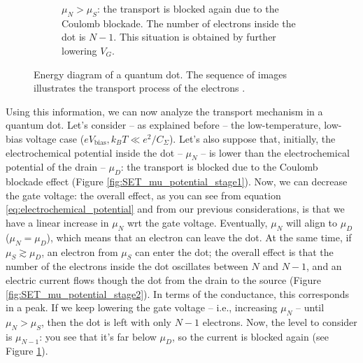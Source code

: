 \begin{figure}
\begin{subfigure}[t]{0.45\textwidth}
		\caption{$\mu_N>\mu_S$: the transport is blocked again due to the Coulomb blockade. The number of electrons inside the dot is $N-1$. This situation is obtained by further lowering $V_G$.}
		\label{fig:SET_mu_potential_stage3}
		\end{subfigure}
	\caption{Energy diagram of a quantum dot. The sequence of images illustrates the transport process of the electrons \citep[adapted from][]{Fasth2007}.}
	\label{fig:SET_mu_potential}
\end{figure}

Using this information, we can now analyze the transport mechanism in a quantum dot. Let's consider -- as explained before -- the low-temperature, low-bias voltage case ($eV_{\text{bias}},k_BT \ll e^2/C_{\Sigma}$). Let's also suppose that, initially, the electrochemical potential inside the dot -- $\mu_N$ -- is lower than the electrochemical potential of the drain -- $\mu_D$: the transport is blocked due to the Coulomb blockade effect (Figure \ref{fig:SET_mu_potential_stage1}). Now, we can decrease the gate voltage: the overall effect, as you can see from equation \eqref{eq:electrochemical_potential} and from our previous considerations, is that we have a linear increase in $\mu_N$ wrt the gate voltage. Eventually, $\mu_N$ will align to $\mu_D$ ($\mu_N = \mu_D$), which means that an electron can leave the dot. At the same time, if $\mu_S \gtrsim \mu_D$, an electron from $\mu_S$ can enter the dot; the overall effect is that the number of the electrons inside the dot oscillates between $N$ and $N-1$, and an electric current flows though the dot from the drain to the source (Figure \ref{fig:SET_mu_potential_stage2}). In terms of the conductance, this corresponds in a peak. If we keep lowering the gate voltage -- i.e., increasing $\mu_N$ -- until $\mu_N > \mu_S$, then the dot is left with only $N-1$ electrons. Now, the level to consider is $\mu_{N-1}$: you see that it's far below $\mu_D$, so the current is blocked again (see Figure \ref{fig:SET_mu_potential_stage3}).

